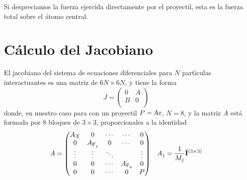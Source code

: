 Si despreciamos la fuerza ejercida directamente por el proyectil, esta es la fuerza total sobre el \'{a}tomo central.


\section{C\'{a}lculo del Jacobiano}
\label{S:calc-jacob}

El jacobiano del sistema de ecuaciones diferenciales para $N$ part\'{\i}culas interactuantes es una matriz de $6N \times 6N$, y tiene la forma
\begin{equation}
  \label{Q:Jacob-ec-dif}
  J =
  \begin{pmatrix}
    0 & A \\
    B & 0 \\
  \end{pmatrix}
\end{equation}
donde, en nuestro caso para  con un proyectil $P=\ce{Ar}$, $N=8$, y la matriz $A$ est\'{a} formada por 8 bloques de $3 \times 3$, proporcionales a la identidad
\begin{align}
  \label{Q:Jacob-ec-dif-A}
  A &=
\begin{pmatrix}
  A_{X} & 0 & \cdots &  \cdots & 0 \\
  0 & A_{\ce{F1}}& 0 & \cdots & 0 \\
  \vdots  & \vdots  & \ddots &  & \vdots  \\
  0 &  0 &\cdots &  A_{\ce{F6}} & 0 \\
  0 & 0 & \cdots & 0 & P
\end{pmatrix}    &A_{j} = \frac{1}{M_{j}} \oper{I}^{(3\times 3)}
\end{align}

